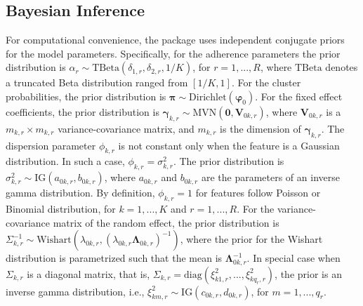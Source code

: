 
\subsection{Bayesian Inference}
For computational convenience, the  package uses independent conjugate priors for the model parameters.  Specifically, for the adherence parameters the prior distribution is $\alpha_r \sim \text{TBeta}(\delta_{1,r}, \delta_{2,r}, 1/K)$, for $r = 1,...,R$, where $\text{TBeta}$ denotes a truncated Beta distribution ranged from $[1/K, 1]$. For the cluster probabilities, the prior distribution is $\boldsymbol{\pi}\sim \text{Dirichlet}(\boldsymbol{\varphi}_0)$.  For the fixed effect coefficients, the prior distribution is $\boldsymbol{\gamma}_{k,r} \sim \text{MVN}(\boldsymbol{0},\boldsymbol{V}_{0k,r})$, where $\boldsymbol{V}_{0k,r}$ is a $m_{k,r} \times m_{k,r}$ variance-covariance matrix, and $m_{k,r}$ is the dimension of $\boldsymbol{\gamma}_{k,r}$. The dispersion parameter  $\phi_{k,r}$ is not constant only when the feature is a Gaussian distribution. In such a case, $\phi_{k,r} = \sigma^2_{k,r}$. The prior distribution is $\sigma^2_{k,r} \sim \text{IG}(a_{0k,r},b_{0k,r}) $, where $a_{0k,r}$ and $b_{0k,r}$ are the parameters of an inverse gamma distribution. By definition, $\phi_{k,r} = 1$ for features follow Poisson or Binomial distribution, for $k=1,...,K$ and $r=1,...,R$. For the variance-covariance matrix of the random effect, the prior distribution is $\Sigma_{k,r}^{-1} \sim \text{Wishart}(\lambda_{0k,r}, (\lambda_{0k,r}\boldsymbol{\Lambda}_{0k,r})^{-1} )$, where the prior for the Wishart distribution is parametrized such that the mean is $\boldsymbol{\Lambda}_{0k,r}^{-1}$. In special case when  $\Sigma_{k,r}$ is a diagonal matrix, that is, $\Sigma_{k,r} = \text{diag}(\xi^2_{k1,r},...,\xi^2_{kq_r,r}) $, the prior is an inverse gamma distribution, i.e., $\xi^2_{km,r} \sim \text{IG}(c_{0k,r},d_{0k,r}) $, for $m = 1,..., q_r$. 


